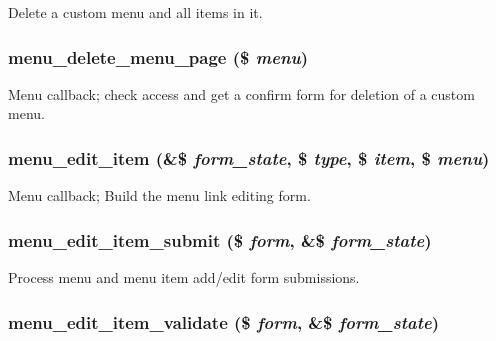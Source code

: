 Delete a custom menu and all items in it. \hypertarget{menu_8admin_8inc_f56ae21f49fb3d481e215ad875f9b4f2}{
\subsubsection[{menu\_\-delete\_\-menu\_\-page}]{\setlength{\rightskip}{0pt plus 5cm}menu\_\-delete\_\-menu\_\-page (\$ {\em menu})}}
\label{menu_8admin_8inc_f56ae21f49fb3d481e215ad875f9b4f2}


Menu callback; check access and get a confirm form for deletion of a custom menu. \hypertarget{menu_8admin_8inc_e26836525f500f39cbe74dccea372926}{
\subsubsection[{menu\_\-edit\_\-item}]{\setlength{\rightskip}{0pt plus 5cm}menu\_\-edit\_\-item (\&\$ {\em form\_\-state}, \/  \$ {\em type}, \/  \$ {\em item}, \/  \$ {\em menu})}}
\label{menu_8admin_8inc_e26836525f500f39cbe74dccea372926}


Menu callback; Build the menu link editing form. \hypertarget{menu_8admin_8inc_78694e41c7d0ed5105c324ca52974cb8}{
\subsubsection[{menu\_\-edit\_\-item\_\-submit}]{\setlength{\rightskip}{0pt plus 5cm}menu\_\-edit\_\-item\_\-submit (\$ {\em form}, \/  \&\$ {\em form\_\-state})}}
\label{menu_8admin_8inc_78694e41c7d0ed5105c324ca52974cb8}


Process menu and menu item add/edit form submissions. \hypertarget{menu_8admin_8inc_9b3b72516acaba98b8be3965616cc735}{
\subsubsection[{menu\_\-edit\_\-item\_\-validate}]{\setlength{\rightskip}{0pt plus 5cm}menu\_\-edit\_\-item\_\-validate (\$ {\em form}, \/  \&\$ {\em form\_\-state})}}
\label{menu_8admin_8inc_9b3b72516acaba98b8be3965616cc735}


